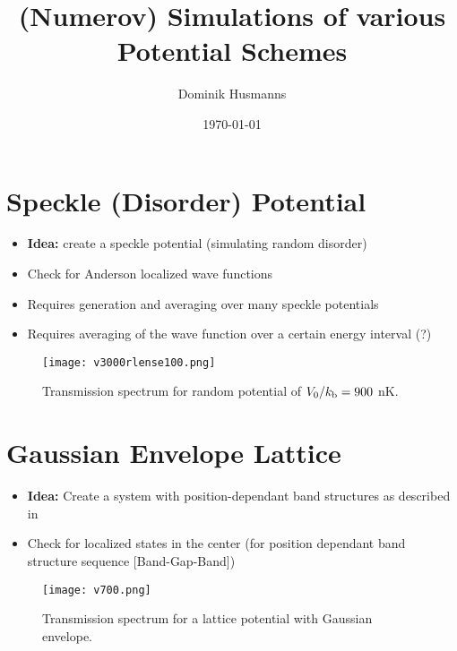 \documentclass[11pt]{article}
\begin{document}

\title{(Numerov) Simulations of various Potential Schemes}
\author{Dominik Husmanns}
\date{\today}   
\newpage

\maketitle

\section{Speckle (Disorder) Potential}
\begin{itemize}
	\item \textbf{Idea:} create a speckle potential (simulating random disorder)
	\item Check for Anderson localized wave functions
	\item Requires generation and averaging over many speckle potentials
	\item Requires averaging of the wave function over a certain energy interval (?) \cite{roman_wavelets_1996}
\end{itemize}

\begin{figure}
	\centering
		\texttt{[image: v3000rlense100.png]}
	\caption{Transmission spectrum for random potential of $V_0/k_{\rm b}=900$ nK.}
	\label{fig:v900}
\end{figure}

\newpage
\section{Gaussian Envelope Lattice}
\begin{itemize}
	\item \textbf{Idea:} Create a system with position-dependant band structures as described in \cite{cheiney_realization_2013}
	\item Check for localized states in the center (for position dependant band structure sequence [Band-Gap-Band])
\end{itemize}

\newpage
\begin{figure}
	\centering
		\texttt{[image: v700.png]}
	\caption{Transmission spectrum for a lattice potential with Gaussian envelope.}
	\label{fig:v700}
\end{figure}

\newpage
\end{document}
